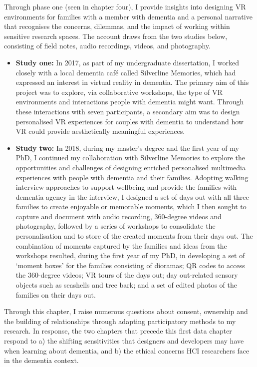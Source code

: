Through phase one (seen in chapter four), I provide insights into designing VR environments for families with a member with dementia and a personal narrative that recognises the concerns, dilemmas, and the impact of working within sensitive research spaces. The account draws from the two studies below, consisting of field notes, audio recordings, videos, and photography. 
\begin{itemize}
    \item \textbf{Study one:} In 2017, as part of my undergraduate dissertation, I worked closely with a local dementia café called Silverline Memories, which had expressed an interest in virtual reality in dementia. The primary aim of this project was to explore, via collaborative workshops, the type of VR environments and interactions people with dementia might want. Through these interactions with seven participants, a secondary aim was to design personalised VR experiences for couples with dementia to understand how VR could provide aesthetically meaningful experiences.

    \item \textbf{Study two:} In 2018, during my master's degree and the first year of my PhD, I continued my collaboration with Silverline Memories to explore the opportunities and challenges of designing enriched personalised multimedia experiences with people with dementia and their families. Adopting walking interview approaches to support wellbeing and provide the families with dementia agency in the interview, I designed a set of days out with all three families to create enjoyable or memorable moments, which I then sought to capture and document with audio recording, 360-degree videos and photography, followed by a series of workshops to consolidate the personalisation and to store of the created moments from their days out. The combination of moments captured by the families and ideas from the workshops resulted, during the first year of my PhD, in developing a set of `moment boxes' for the families consisting of dioramas; QR codes to access the 360-degree videos; VR tours of the days out; day out-related sensory objects such as seashells and tree bark; and a set of edited photos of the families on their days out.

\end{itemize}

Through this chapter, I raise numerous questions about consent, ownership and the building of relationships through adapting participatory methods to my research. In response, the two chapters that precede this first data chapter respond to a) the shifting sensitivities that designers and developers may have when learning about dementia, and b) the ethical concerns HCI researchers face in the dementia context.

